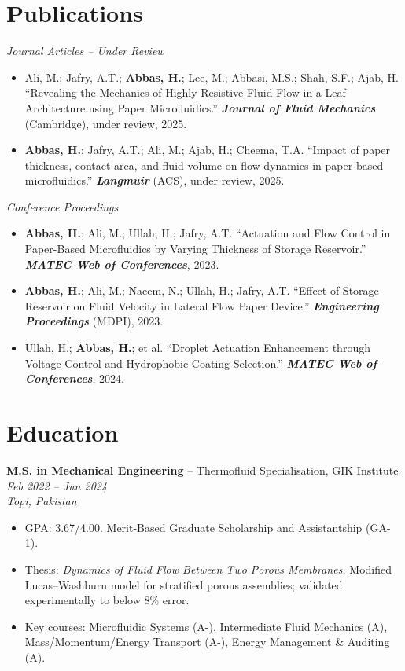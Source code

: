 \documentclass[11pt,a4paper]{article}
\begin{document}
\section{Publications}

\textit{Journal Articles -- Under Review}
\begin{itemize}
  \item Ali, M.; Jafry, A.T.; \textbf{Abbas, H.}; Lee, M.; Abbasi, M.S.; Shah,
        S.F.; Ajab, H. ``Revealing the Mechanics of Highly Resistive Fluid Flow in
        a Leaf Architecture using Paper Microfluidics.''
        \textbf{\textit{Journal of Fluid Mechanics}} (Cambridge), under review,
        2025.
  \item \textbf{Abbas, H.}; Jafry, A.T.; Ali, M.; Ajab, H.; Cheema, T.A.
        ``Impact of paper thickness, contact area, and fluid volume on flow
        dynamics in paper-based microfluidics.''
        \textbf{\textit{Langmuir}} (ACS), under review, 2025.
\end{itemize}

\vspace{4pt}
\textit{Conference Proceedings}
\begin{itemize}
  \item \textbf{Abbas, H.}; Ali, M.; Ullah, H.; Jafry, A.T. ``Actuation and Flow
        Control in Paper-Based Microfluidics by Varying Thickness of Storage
        Reservoir.'' \textbf{\textit{MATEC Web of Conferences}}, 2023.
  \item \textbf{Abbas, H.}; Ali, M.; Naeem, N.; Ullah, H.; Jafry, A.T. ``Effect
        of Storage Reservoir on Fluid Velocity in Lateral Flow Paper Device.''
        \textbf{\textit{Engineering Proceedings}} (MDPI), 2023.
  \item Ullah, H.; \textbf{Abbas, H.}; et al. ``Droplet Actuation Enhancement
        through Voltage Control and Hydrophobic Coating Selection.''
        \textbf{\textit{MATEC Web of Conferences}}, 2024.
\end{itemize}

\section{Education}

\textbf{M.S. in Mechanical Engineering} -- Thermofluid Specialisation, GIK
Institute \hfill \textit{Feb 2022 -- Jun 2024}\\
\textit{Topi, Pakistan}
\begin{itemize}
  \item GPA: 3.67/4.00. Merit-Based Graduate Scholarship and Assistantship (GA-1).
  \item Thesis: \textit{Dynamics of Fluid Flow Between Two Porous Membranes.}
        Modified Lucas--Washburn model for stratified porous assemblies; validated
        experimentally to below 8\% error.
  \item Key courses: Microfluidic Systems (A-), Intermediate Fluid Mechanics (A),
        Mass/Momentum/Energy Transport (A-), Energy Management \& Auditing (A).
\end{itemize}
\end{document}
